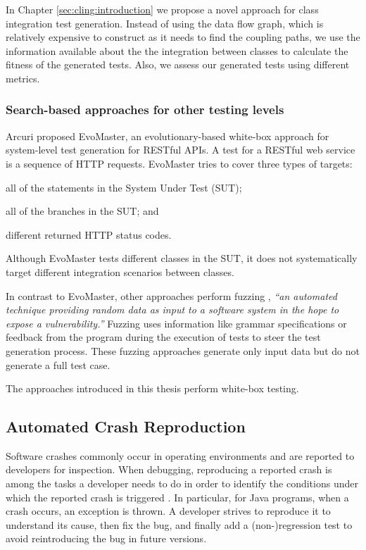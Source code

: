 In Chapter \ref{sec:cling:introduction} we propose a novel approach for class integration test generation.
Instead of using the data flow graph, which is relatively expensive to construct as it needs to find the coupling paths, we use the information available about the the integration between classes to calculate the fitness of the generated tests. Also, we assess our generated tests using different metrics.

\subsubsection{Search-based approaches for other testing levels}

Arcuri \cite{Arcuri2019} proposed EvoMaster, an evolutionary-based white-box approach for system-level test generation for RESTful APIs. A test for a RESTful web service is a sequence of HTTP requests. EvoMaster tries to cover three types of targets:
 \begin{inparaenum}[(i)]
 \item all of the statements in the System Under Test (SUT);
 \item all of the branches in the SUT; and
\item different returned HTTP status codes.
\end{inparaenum}
Although EvoMaster tests different classes in the SUT, it does not systematically target different integration scenarios between classes.

In contrast to EvoMaster, other approaches perform fuzzing \cite{Holler2012}, \textit{``an automated technique providing random data as input to a software system in the hope to expose a vulnerability.''} Fuzzing uses information like grammar specifications \cite{Holler2012, beyene2012, coppit2005, godefroid2008} or feedback from the program during the execution of tests \cite{Padhye2019} to steer the test generation process.
These fuzzing approaches generate only input data but do not generate a full test case.

The approaches introduced in this thesis perform white-box testing.

\subsection{Automated Crash Reproduction}
Software crashes commonly occur in operating environments and are reported to developers for inspection.
When debugging, reproducing a reported crash is among the tasks a developer needs to do in order to identify the conditions under which the reported crash is triggered \cite{Zeller2009, BellerICSE2018}.
In particular, for Java programs, when a crash occurs, an exception is thrown. A developer strives to reproduce it to understand its cause, then fix the bug, and finally add a (non-)regression test to avoid reintroducing the bug in future versions. 

